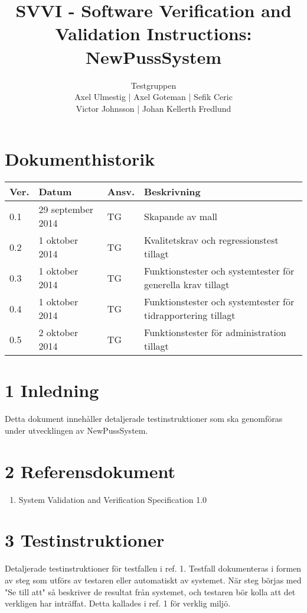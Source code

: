 \documentclass[a4paper]{article}
\title{SVVI - Software Verification and Validation Instructions: NewPussSystem}
\author{Testgruppen \\ Axel Ulmestig | Axel Goteman | Sefik Ceric \\ Victor Johnsson | Johan Kellerth Fredlund}
\date{}
\begin{document}
\maketitle
\thispagestyle{fancy}
\tableofcontents
\newpage

\section*{Dokumenthistorik}

\begin{tabular}{ l l l p{9cm} }
Ver. & Datum & Ansv. & Beskrivning \\\hline
0.1 & 29 september 2014 & TG & Skapande av mall \\
0.2 & 1 oktober 2014 & TG & Kvalitetskrav och regressionstest tillagt \\
0.3 & 1 oktober 2014 & TG & Funktionstester och systemtester för generella krav tillagt\\
0.4 & 1 oktober 2014 & TG & Funktionstester och systemtester för tidrapportering tillagt\\
0.5 & 2 oktober 2014 & TG & Funktionstester för administration tillagt\\

\end{tabular}
\section{1 Inledning}       

Detta dokument innehåller detaljerade testinstruktioner som ska genomföras under utvecklingen av NewPussSystem.

\section{2 Referensdokument}
\begin{enumerate}
\item System Validation and Verification Specification 1.0
\end{enumerate}



\section{3 Testinstruktioner}
Detaljerade testinstruktioner för testfallen i ref. 1. Testfall dokumenteras i formen av steg som utförs av testaren eller automatiskt av systemet. När steg börjas med "Se till att" så beskriver de resultat från systemet, och testaren bör kolla att det verkligen har inträffat. Detta kallades i ref. 1 för verklig miljö.
\end{document}

